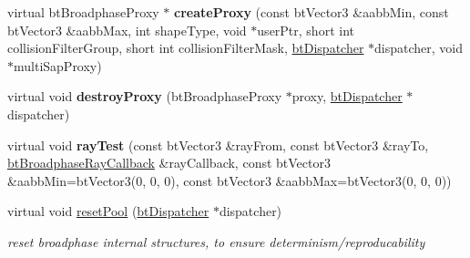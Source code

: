 \begin{DoxyCompactItemize}
\mbox{\label{classbtGpu3DGridBroadphase_a71cda38c8610d2b5e714edc3feaafff0}} 
virtual bt\+Broadphase\+Proxy $\ast$ {\bfseries create\+Proxy} (const bt\+Vector3 \&aabb\+Min, const bt\+Vector3 \&aabb\+Max, int shape\+Type, void $\ast$user\+Ptr, short int collision\+Filter\+Group, short int collision\+Filter\+Mask, \hyperlink{classbtDispatcher}{bt\+Dispatcher} $\ast$dispatcher, void $\ast$multi\+Sap\+Proxy)
\item 
\mbox{\label{classbtGpu3DGridBroadphase_a5e48ca45467676489ee0a4662edab457}} 
virtual void {\bfseries destroy\+Proxy} (bt\+Broadphase\+Proxy $\ast$proxy, \hyperlink{classbtDispatcher}{bt\+Dispatcher} $\ast$dispatcher)
\item 
\mbox{\label{classbtGpu3DGridBroadphase_a3f19bf81f9e3f375d00605878f568728}} 
virtual void {\bfseries ray\+Test} (const bt\+Vector3 \&ray\+From, const bt\+Vector3 \&ray\+To, \hyperlink{structbtBroadphaseRayCallback}{bt\+Broadphase\+Ray\+Callback} \&ray\+Callback, const bt\+Vector3 \&aabb\+Min=bt\+Vector3(0, 0, 0), const bt\+Vector3 \&aabb\+Max=bt\+Vector3(0, 0, 0))
\item 
\mbox{\label{classbtGpu3DGridBroadphase_a5f5f3a005c81d2153fcf441f8f2a6457}} 
virtual void \hyperlink{classbtGpu3DGridBroadphase_a5f5f3a005c81d2153fcf441f8f2a6457}{reset\+Pool} (\hyperlink{classbtDispatcher}{bt\+Dispatcher} $\ast$dispatcher)
\begin{DoxyCompactList}\small\item\em reset broadphase internal structures, to ensure determinism/reproducability \end{DoxyCompactList}\end{DoxyCompactItemize}
